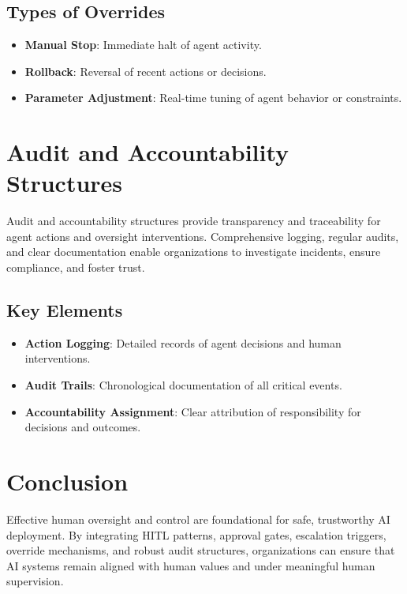 \begin{TNtwocol}
\subsection{Types of Overrides}
\begin{itemize}
    \item \textbf{Manual Stop}: Immediate halt of agent activity.
    \item \textbf{Rollback}: Reversal of recent actions or decisions.
    \item \textbf{Parameter Adjustment}: Real-time tuning of agent behavior or constraints.
\end{itemize}

\section{Audit and Accountability Structures}
Audit and accountability structures provide transparency and traceability for agent actions and oversight interventions. Comprehensive logging, regular audits, and clear documentation enable organizations to investigate incidents, ensure compliance, and foster trust.

\subsection{Key Elements}
\begin{itemize}
    \item \textbf{Action Logging}: Detailed records of agent decisions and human interventions.
    \item \textbf{Audit Trails}: Chronological documentation of all critical events.
    \item \textbf{Accountability Assignment}: Clear attribution of responsibility for decisions and outcomes.
\end{itemize}

\section{Conclusion}
Effective human oversight and control are foundational for safe, trustworthy AI deployment. By integrating HITL patterns, approval gates, escalation triggers, override mechanisms, and robust audit structures, organizations can ensure that AI systems remain aligned with human values and under meaningful human supervision.

\end{TNtwocol}
